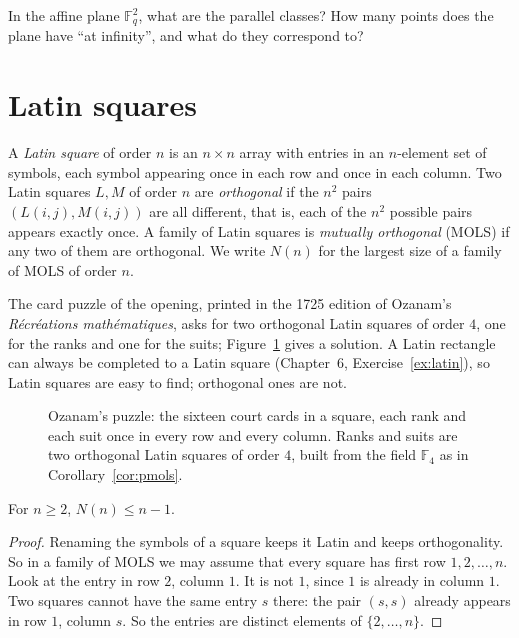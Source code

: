 \begin{think}
In the affine plane $\mathbb F_q^2$, what are the parallel classes? How many points does the plane have ``at infinity'', and what do they correspond to?
\end{think}

\section{Latin squares}

\begin{definition}\label{def:latin}
A \emph{Latin square} of order $n$ is an $n\times n$ array with entries in an $n$-element set of symbols, each symbol appearing once in each row and once in each column. Two Latin squares $L,M$
of order $n$ are \emph{orthogonal} if the $n^2$ pairs $(L(i,j),M(i,j))$ are all different, that is, each of the $n^2$ possible pairs appears exactly once. A family of Latin squares is
\emph{mutually orthogonal} (MOLS) if any two of them are orthogonal. We write $N(n)$ for the largest size of a family of MOLS of order $n$.
\end{definition}

The card puzzle of the opening, printed in the 1725 edition of Ozanam's \emph{R\'ecr\'eations math\'ematiques}, asks for two orthogonal Latin squares of order $4$, one for the ranks and one for the
suits; Figure~\ref{fig:cards} gives a solution. A Latin rectangle can always be completed to a Latin square (Chapter~6, Exercise~\ref{ex:latin}), so Latin squares are easy to find; orthogonal
ones are not.

\begin{figure}[ht]
\centering
{}
\caption{Ozanam's puzzle: the sixteen court cards in a square, each rank and each suit once in every row and every column. Ranks and suits are two orthogonal Latin squares of order $4$, built
from the field $\mathbb F_4$ as in Corollary~\ref{cor:pmols}.}
\label{fig:cards}
\end{figure}

\begin{proposition}\label{prop:molsbound}
For $n\ge2$, $N(n)\le n-1$.
\end{proposition}
\begin{proof}
Renaming the symbols of a square keeps it Latin and keeps orthogonality. So in a family of MOLS we may assume that every square has first row $1,2,\dots,n$. Look at the entry in row $2$,
column $1$. It is not $1$, since $1$ is already in column $1$. Two squares cannot have the same entry $s$ there: the pair $(s,s)$ already appears in row $1$, column $s$. So the entries are distinct
elements of $\{2,\dots,n\}$.
\end{proof}


